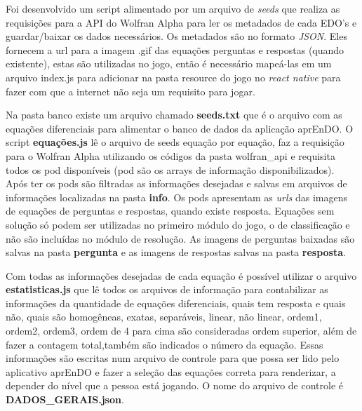 Foi desenvolvido um script alimentado por um arquivo de \textit{seeds} que realiza as requisições para a API do Wolfran Alpha para ler os metadados de cada EDO's e guardar/baixar os dados necessários. Os metadados são no formato \textit{JSON}. Eles fornecem a url para a imagem .gif das equações perguntas e respostas (quando existente), estas são utilizadas no jogo, então é necessário mapeá-las em um arquivo index.js para adicionar na pasta resource do jogo no \textit{react native} para fazer com que a internet não seja um requisito para jogar.

Na pasta banco existe um arquivo chamado \textbf{seeds.txt} que é o arquivo com as equações diferenciais para alimentar o banco de dados da aplicação aprEnDO. O script \textbf{equações.js} lê o arquivo de seeds equação por equação, faz a requisição para o Wolfran Alpha utilizando os códigos da pasta wolfran\_api e requisita todos os pod disponíveis (pod são os arrays de informação disponibilizados). Após ter os pods são filtradas as informações desejadas e salvas em arquivos de informações localizadas na pasta \textbf{info}. Os pods apresentam as \textit{urls} das imagens de equações de perguntas e respostas, quando existe resposta. Equações sem solução só podem ser utilizadas no primeiro módulo do jogo, o de classificação e não são incluídas no módulo de resolução. As imagens de perguntas baixadas são salvas na pasta \textbf{pergunta} e as imagens de respostas salvas na pasta \textbf{resposta}.

Com todas as informações desejadas de cada equação é possível utilizar o arquivo \textbf{estatisticas.js} que lê todos os arquivos de informação para contabilizar as informações da quantidade de equações diferenciais, quais tem resposta e quais não, quais são homogêneas, exatas, separáveis, linear, não linear, ordem1, ordem2, ordem3, ordem de 4 para cima são consideradas ordem superior, além de fazer a contagem total,também são indicados o número da equação. Essas informações são escritas num arquivo de controle para que possa ser lido pelo aplicativo aprEnDO e fazer a seleção das equações correta para renderizar, a depender do nível que a pessoa está jogando. O nome do arquivo de controle é \textbf{DADOS\_GERAIS.json}.
